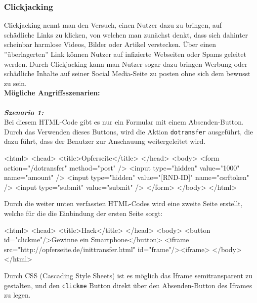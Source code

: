 \subsubsection{Clickjacking}

Clickjacking nennt man den Versuch, einen Nutzer dazu zu bringen, auf schädliche Links zu klicken, von welchen man zunächst denkt, dass sich dahinter scheinbar harmlose Videos, Bilder oder Artikel verstecken. Über einen ''überlagerten'' Link können Nutzer auf infizierte Webseiten oder Spams geleitet werden. Durch Clickjacking kann man Nutzer sogar dazu bringen Werbung oder schädliche Inhalte auf seiner Social Media-Seite zu posten ohne sich dem bewusst zu sein\cite{cj16}.\\

\textbf{Mögliche Angriffsszenarien:}\\
\\
\textbf{\textit{Szenario 1:}}\\

Bei diesem HTML-Code gibt es nur ein Formular mit einem Absenden-Button. Durch das Verwenden dieses Buttons, wird die Aktion \texttt{dotransfer} ausgeführt, die dazu führt, dass der Benutzer zur Anschauung weitergeleitet wird\cite{cjd13}.\\


\begin{LaTeXCode}[caption={Opferseite},captionpos=b, label=LaTeXCode:cj1][numbers=none]
<html>
	<head>
	<title>Opferseite</title>
	</head>
	<body>
	<form action="/dotransfer" method="post" />
		<input type="hidden" value="1000" name="amount" />
		<input type="hidden" value="[RND-ID]" name="csrftoken" />
		<input type="submit" value="submit" />
	</form>
	</body>
</html>
\end{LaTeXCode}

Durch die weiter unten verfassten HTML-Codes wird eine zweite Seite erstellt, welche für die die Einbindung der ersten Seite sorgt\cite{cjd13}:\\

\begin{LaTeXCode}[caption={Hackseite},captionpos=b, label=LaTeXCode:cj2][numbers=none]
<html>
	<head>
	<title>Hack</title>
	</head>
	<body>
		<button id="clickme"/>Gewinne ein Smartphone</button>
		<iframe src="http://opferseite.de/inittransfer.html" id="frame"/><iframe>
	</body>
</html>
\end{LaTeXCode}

Durch CSS (Cascading Style Sheets) ist es möglich das Iframe semitransparent zu gestalten, und den \texttt{clickme} Button direkt über den Absenden-Button des Iframes zu legen\cite{cjd13}.\\

